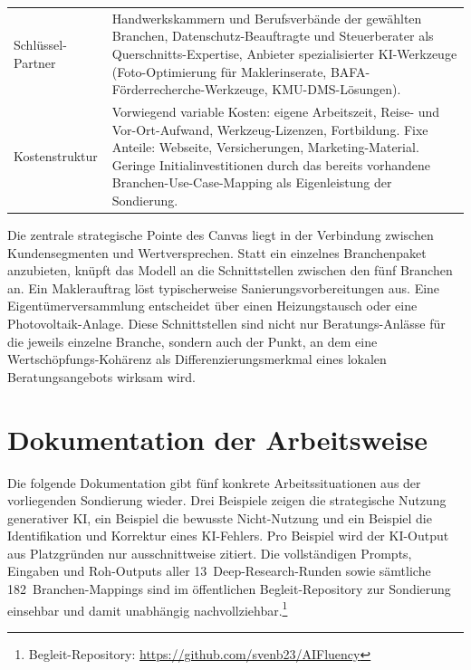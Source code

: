 \documentclass[a4paper,11pt]{article}
\begin{document}
\begin{table}[H]
\begin{tabular}{p{3.5cm}p{11cm}}
Schlüssel-Partner & Handwerkskammern und Berufs\-verbände der gewählten Branchen, Datenschutz-Beauftragte und Steuer\-berater als Querschnitts-Expertise, Anbieter spezialisierter KI-Werkzeuge (Foto-Optimierung für Maklerinserate, BAFA-Förder\-recherche-Werkzeuge, KMU-DMS-Lösungen). \\
Kostenstruktur & Vorwiegend variable Kosten: eigene Arbeitszeit, Reise- und Vor-Ort-Aufwand, Werkzeug-Lizenzen, Fortbildung. Fixe Anteile: Webseite, Versicherungen, Marketing-Material. Geringe Initialinvestitionen durch das bereits vorhandene Branchen-Use-Case-Mapping als Eigen\-leistung der Sondierung. \\
\bottomrule
\end{tabular}
\end{table}

Die zentrale strategische Pointe des Canvas liegt in der Verbindung
zwischen Kundensegmenten und Wertversprechen. Statt ein einzelnes
Branchen\-paket anzubieten, knüpft das Modell an die Schnittstellen
zwischen den fünf Branchen an. Ein Maklerauftrag löst typischerweise
Sanierungs\-vorbereitungen aus. Eine Eigentümerversammlung entscheidet
über einen Heizungs\-tausch oder eine Photovoltaik-Anlage. Diese
Schnittstellen sind nicht nur Beratungs-Anlässe für die jeweils
einzelne Branche, sondern auch der Punkt, an dem eine
Wertschöpfungs-Kohärenz als Differenzierungs\-merkmal eines lokalen
Beratungs\-angebots wirksam wird.

\section{Dokumentation der Arbeitsweise}

Die folgende Dokumentation gibt fünf konkrete Arbeitssituationen aus der
vorliegenden Sondierung wieder. Drei Beispiele zeigen die strategische
Nutzung generativer KI, ein Beispiel die bewusste Nicht-Nutzung und ein
Beispiel die Identifikation und Korrektur eines KI-Fehlers. Pro
Beispiel wird der KI-Output aus Platzgründen nur ausschnittweise
zitiert. Die vollständigen Prompts, Eingaben und Roh-Outputs aller
13~Deep-Research-Runden sowie sämtliche 182~Branchen-Mappings sind im
öffentlichen Begleit-Repository zur Sondierung einsehbar und damit
unabhängig nachvollziehbar.\footnote{Begleit-Repository:
\url{https://github.com/svenb23/AIFluency}}

\end{document}
